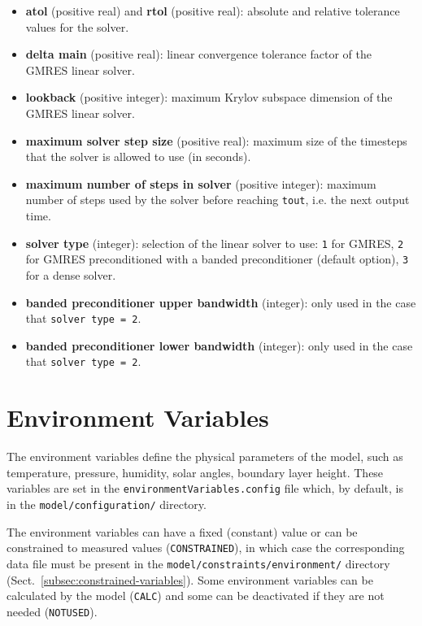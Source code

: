 \begin{itemize}
\item \textbf{atol} (positive real) and \textbf{rtol} (positive real):
  absolute and relative tolerance values for the solver.
\item \textbf{delta main} (positive real): linear convergence
  tolerance factor of the GMRES linear solver.
\item \textbf{lookback} (positive integer): maximum Krylov subspace
  dimension of the GMRES linear solver.
\item \textbf{maximum solver step size} (positive real): maximum size
  of the timesteps that the solver is allowed to use (in seconds).
\item \textbf{maximum number of steps in solver} (positive integer):
  maximum number of steps used by the solver before reaching
  \texttt{tout}, i.e. the next output time.
\item \textbf{solver type} (integer): selection of the linear solver
  to use: \texttt{1} for GMRES, \texttt{2} for GMRES preconditioned
  with a banded preconditioner (default option), \texttt{3} for a
  dense solver.
\item \textbf{banded preconditioner upper bandwidth} (integer): only
  used in the case that \texttt{solver\ type\ =\ 2}.
\item \textbf{banded preconditioner lower bandwidth} (integer): only
  used in the case that \texttt{solver\ type\ =\ 2}.
\end{itemize}

\section{Environment Variables} \label{sec:environment-variables}

The environment variables define the physical parameters of the model,
such as temperature, pressure, humidity, solar angles, boundary layer
height. These variables are set in the \texttt{environmentVariables.config}
file which, by default, is in the \texttt{model/configuration/}
directory.

The environment variables can have a fixed (constant) value or can be
constrained to measured values (\texttt{CONSTRAINED}), in which case
the corresponding data file must be present in the
\texttt{model/constraints/environment/} directory
(Sect.~\ref{subsec:constrained-variables}). Some environment variables
can be calculated by the model (\texttt{CALC}) and some can be
deactivated if they are not needed (\texttt{NOTUSED}).

